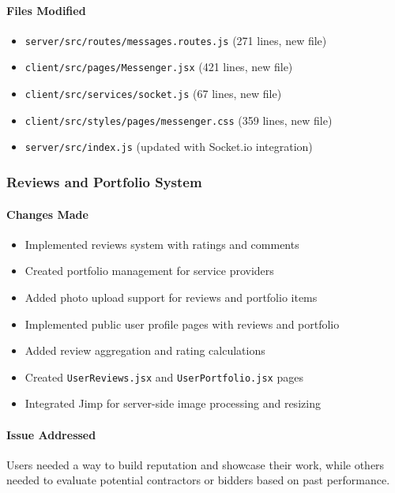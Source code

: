 \documentclass[11pt]{article}
\begin{document}
\paragraph{Files Modified}
\begin{itemize}[leftmargin=1.4em]
  \item \texttt{server/src/routes/messages.routes.js} (271 lines, new file)
  \item \texttt{client/src/pages/Messenger.jsx} (421 lines, new file)
  \item \texttt{client/src/services/socket.js} (67 lines, new file)
  \item \texttt{client/src/styles/pages/messenger.css} (359 lines, new file)
  \item \texttt{server/src/index.js} (updated with Socket.io integration)
\end{itemize}

\subsubsection{Reviews and Portfolio System}
\paragraph{Changes Made}
\begin{itemize}[leftmargin=1.4em]
  \item Implemented reviews system with ratings and comments
  \item Created portfolio management for service providers
  \item Added photo upload support for reviews and portfolio items
  \item Implemented public user profile pages with reviews and portfolio
  \item Added review aggregation and rating calculations
  \item Created \texttt{UserReviews.jsx} and \texttt{UserPortfolio.jsx} pages
  \item Integrated Jimp for server-side image processing and resizing
\end{itemize}

\paragraph{Issue Addressed}
Users needed a way to build reputation and showcase their work, while others needed to evaluate potential contractors or bidders based on past performance.
\end{document}
